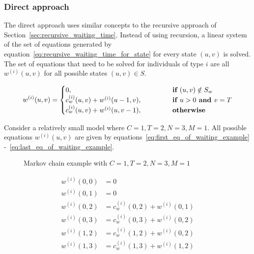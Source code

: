 \subsubsection{Direct approach}\label{sec:direct_waiting_time}

The direct approach uses similar concepts to the recursive approach of
Section~\ref{sec:recursive_waiting_time}.
Instead of using recursion, a linear system of the set of equations generated by
equation~\eqref{eq:recursive_waiting_time_for_state} for every state \((u,v)\)
is solved.
The set of equations that need to be solved for individuals of type \(i\) are
all \( w^{(i)}(u, v) \) for all possible states \((u,v) \in S\).


\begin{equation*}
    w^{(i)}(u,v) =
    \begin{cases}
        0, \hspace{4.85cm} & \textbf{if } (u,v) \notin S_w \\
        c^{(i)}_w(u,v) + w^{(i)}(u-1, v), & \textbf{if } u > 0
        \textbf{ and } v = T \\
        c^{(i)}_w(u,v) + w^{(i)}(u, v-1), & \textbf{otherwise}
    \end{cases}
\end{equation*}

Consider a relatively small model where \(C=1, T=2, N=3, M=1\).
All possible equations \(w^{(i)}(u,v)\) are given by
equations~\eqref{eq:first_eq_of_waiting_example}
-~\eqref{eq:last_eq_of_waiting_example}.

\begin{minipage}{0.45\textwidth}
    \begin{figure}[H]
        \centering
        \scalebox{0.65}{}
        \caption{Markov chain example with \(C=1, T=2, N=3, M=1\)}
        \label{fig:example_algeb_waiting}
    \end{figure}
\end{minipage}
\begin{minipage}{0.5\textwidth}
    \begin{align}
        w^{(i)}(0,0) &= 0 \\
        w^{(i)}(0,1) &= 0 \\
        w^{(i)}(0,2) &= c^{(i)}_w(0,2) + w^{(i)}(0,1) \label{eq:first_eq_of_waiting_example} \\
        w^{(i)}(0,3) &= c^{(i)}_w(0,3) + w^{(i)}(0,2) \\
        w^{(i)}(1,2) &= c^{(i)}_w(1,2) + w^{(i)}(0,2) \\
        w^{(i)}(1,3) &= c^{(i)}_w(1,3) + w^{(i)}(1,2) \label{eq:last_eq_of_waiting_example}
    \end{align}
\end{minipage}


